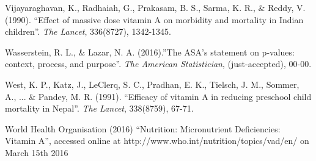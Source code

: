 \documentclass[12pt]{article}
\begin{document}
\begin{thebibliography}{99}
 Vijayaraghavan, K., Radhaiah, G., Prakasam, B. S., Sarma, K. R., \& Reddy, V. (1990). ``Effect of massive dose vitamin A on morbidity and mortality in Indian children''. \emph{The Lancet}, 336(8727), 1342-1345.

 Wasserstein, R. L., \& Lazar, N. A. (2016).''The ASA's statement on p-values: context, process, and purpose''. \emph{The American Statistician}, (just-accepted), 00-00.

 West, K. P., Katz, J., LeClerq, S. C., Pradhan, E. K., Tielsch, J. M., Sommer, A., ... \& Pandey, M. R. (1991). ``Efficacy of vitamin A in reducing preschool child mortality in Nepal''. \emph{The Lancet}, 338(8759), 67-71.

 World Health Organisation (2016) ``Nutrition: Micronutrient Deficiencies: Vitamin A'', accessed online at http://www.who.int/nutrition/topics/vad/en/ on March 15th 2016


\end{thebibliography}


\end{document}
